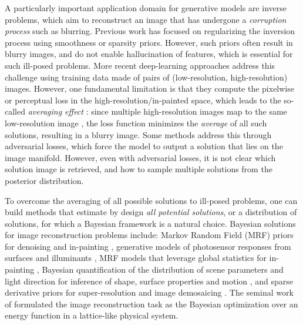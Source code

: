 \documentclass{article}
\begin{document}
A particularly important application domain for generative models are inverse problems, which aim to reconstruct an image that has undergone a \emph{corruption process} such as blurring. Previous work has focused on regularizing the inversion process using smoothness \cite{tikhonov1963solution} or sparsity \cite{figueiredo2005bound,mairal2009online,aharon2006k} priors. However, such priors often result in blurry images, and do not enable hallucination of features, which is essential for such ill-posed problems. More recent deep-learning approaches \cite{wang2018esrgan,li2019feedback,yu2018generative,yu2019free} address this challenge using training data made of pairs of (low-resolution, high-resolution) images. However, one fundamental limitation is that they compute the pixelwise or perceptual loss in the high-resolution/in-painted space, which leads to the so-called \emph{averaging effect} \cite{ledig2017photo}: since multiple high-resolution images map to the same low-resolution image , the loss function minimizes the \emph{average} of all such solutions, resulting in a blurry image. Some methods \cite{ledig2017photo,pathak2016context} address this through adversarial losses, which force the model to output a solution that lies on the image manifold. However, even with adversarial losses, it is not clear which solution image is retrieved, and how to sample multiple solutions from the posterior distribution.

To overcome the averaging of all possible solutions to ill-posed problems, one can build methods that estimate by design \emph{all potential solutions}, or a distribution of solutions, for which a Bayesian framework is a natural choice. Bayesian solutions for image reconstruction problems include: Markov Random Field (MRF) priors for denoising and in-painting \cite{roth2005fields}, generative models of photosensor responses from surfaces and illuminants \cite{brainard1997bayesian}, MRF models that leverage global statistics for in-painting \cite{levin2003learning}, Bayesian quantification of the distribution of scene parameters and light direction for inference of shape, surface properties and motion \cite{freeman1994generic}, and sparse derivative priors for super-resolution and image demosaicing \cite{russell2003exploiting}. The seminal work of \cite{geman1984stochastic} formulated the image reconstruction task as the Bayesian optimization over an energy function in a lattice-like physical system. 
\end{document}
